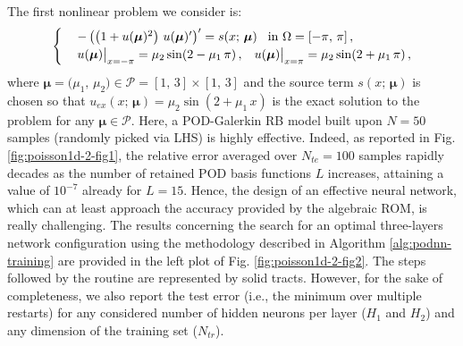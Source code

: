 \documentclass[12pt, a4paper, twoside, openright, notitlepage]{report}
\numberwithin{equation}{chapter}
\theoremstyle{theorem}
\theoremstyle{definition}
\theoremstyle{remark}
\theoremstyle{proposition}
\numberwithin{figure}{chapter}
\newcommand{\bg}[1]{\boldsymbol{#1}}
\begin{document}
		The first nonlinear problem we consider is:
		\begin{equation}
			\label{eq:poisson1d-2}
			\begin{cases}
				& - \left( \big( 1 + u(\bg{\mu})^2 \big) ~ u(\bg{\mu})' \right)' = s(x; \, \bg{\mu}) \hspace*{0.3cm} \text{in $\Omega = [-\pi, \, \pi]$} \, , \\
				& u(\bg{\mu}) \big|_{x = -\pi} = \mu_2 \sin(2 - \mu_1 \, \pi) \, , \hspace*{0.3cm} u(\bg{\mu}) \big|_{x = \pi} = \mu_2 \sin(2 + \mu_1 \, \pi)  \, ,
			\end{cases}
		\end{equation}
		where $\bg{\mu} = \big( \mu_1, \, \mu_2 \big) \in \mathcal{P} = [1, \, 3] \times [1, \, 3]$ and the source term $s(x; \, \bg{\mu})$ is chosen so that $u_{ex}(x; \, \bg{\mu}) = \mu_2 \sin(2 + \mu_1 \, x)$ is the exact solution to the problem for any $\bg{\mu} \in \mathcal{P}$. Here, a POD-Galerkin RB model built upon $N = 50$ samples (randomly picked via LHS) is highly effective. Indeed, as reported in Fig. \ref{fig:poisson1d-2-fig1}, the relative error averaged over $N_{te} = 100$ samples rapidly decades as the number of retained POD basis functions $L$ increases, attaining a value of $10^{-7}$ already for $L = 15$. Hence, the design of an effective neural network, which can at least approach the accuracy provided by the algebraic ROM, is really challenging. The results concerning the search for an optimal three-layers network configuration using the methodology described in Algorithm \ref{alg:podnn-training} are provided in the left plot of Fig. \ref{fig:poisson1d-2-fig2}. The steps followed by the routine are represented by solid tracts. However, for the sake of completeness, we also report the test error (i.e., the minimum over multiple restarts) for any considered number of hidden neurons per layer ($H_1$ and $H_2$) and any dimension of the training set ($N_{tr}$). 
		
\end{document}
